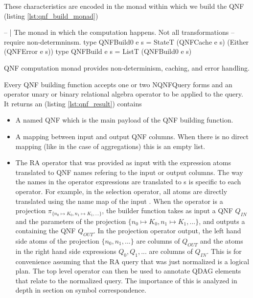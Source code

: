 These characteristics are encoded in the monad within which we build
the QNF (listing \ref{lst:qnf_build_monad})

\begin{code}
  \begin{haskellcode}
    -- | The monad in which the computation happens. Not all transformations
    -- require non-determninsm.
    type QNFBuild0 e s = StateT (QNFCache e s) (Either (QNFError e s))
    type QNFBuild e s = ListT (QNFBuild0 e s)
  \end{haskellcode}
  \caption{\label{lst:qnf_build_monad}QNF computation monad provides
    non-determinism, caching, and error handling.}
\end{code}

Every QNF building function accepts one or two {NQNFQuery} forms and an
operator unary or binary relational algebra operator to be applied to the query.
It returns an  (listing \ref{lst:qnf_result}) contains

\begin{itemize}
\item A  named QNF which is the main payload of the QNF building function.
\item A mapping between input and output QNF columns. When there is no direct mapping
 (like in the case of aggregations) this is an empty list.
\item The RA operator that was provided as input with the expression atoms
  translated to QNF names
  refering to the input or output columns. The way the names in the operator expressions are translated to
  s is specific to each operator. For example,
  in the selection operator, all atoms are directly translated
  using the name map of the input . When the operator is a
  projection \(\pi_{\{n_0 \mapsto K_0, n_1 \mapsto K_1, ...\}}\), the
  builder function takes as input a QNF \(Q_{IN}\) and the parameters of the projection
  \(\{n_0 \mapsto K_0, n_1 \mapsto K_1, ...\}\), and outputs a  containing the
  QNF \(Q_{OUT}\).
  In the projection operator output, the left hand side atoms of the projection \(\{n_0, n_1, ...\}\) are
  columns of \(Q_{OUT}\) and the atoms in the right hand side expressions \(Q_0,Q_1,...\) are columns of \(Q_{IN}\).
  This is for convenience assuming that the RA
  query that was just normalized is a logical plan. The top level
  operator can then be used to annotate QDAG elements that relate to
  the normalized query. The importance of this is analyzed in depth in
  section \label{sel:symbol_correspondence} on symbol correspondence.

\end{itemize}

